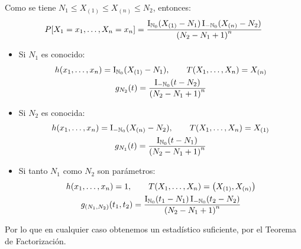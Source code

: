\begin{ejercicio}
\begin{enumerate}[label=\alph*)]
            Como se tiene $N_1\leq X_{(1)}\leq X_{(n)}\leq N_2$, entonces:
            \begin{equation*}
                P[X_1=x_1, \ldots, X_n=x_n] = \dfrac{\operatorname{I}_{\mathbb{N}_0}(X_{(1)}-N_1)\operatorname{I}_{-\mathbb{N}_0}(X_{(n)}-N_2)}{{(N_2-N_1+1)}^{n}}
            \end{equation*}
            \begin{itemize}
                \item Si $N_1$ es conocido:
                    \begin{gather*}
                        h(x_1, \ldots, x_n) = \operatorname{I}_{\mathbb{N}_0}(X_{(1)}-N_1), \qquad T(X_1, \ldots, X_n) = X_{(n)} \\
                        g_{N_2}(t) = \dfrac{\operatorname{I}_{-\mathbb{N}_0}(t-N_2)}{{(N_2-N_1+1)}^{n}}
                    \end{gather*}
                \item Si $N_2$ es conocida:
                    \begin{gather*}
                        h(x_1, \ldots, x_n) = \operatorname{I}_{-\mathbb{N}_0}(X_{(n)}-N_2), \qquad T(X_1, \ldots, X_n) = X_{(1)} \\
                        g_{N_1}(t) = \dfrac{\operatorname{I}_{\mathbb{N}_0}(t-N_1)}{{(N_2-N_1+1)}^{n}}
                    \end{gather*}
                \item Si tanto $N_1$ como $N_2$ son parámetros:
                    \begin{gather*}
                        h(x_1,\ldots,x_n) = 1, \qquad T(X_1, \ldots, X_n) = \left(X_{(1)}, X_{(n)}\right) \\
                        g_{(N_1,N_2)}(t_1,t_2) = \dfrac{\operatorname{I}_{\mathbb{N}_0}(t_1-N_1)\operatorname{I}_{-\mathbb{N}_0}(t_2-N_2)}{{(N_2-N_1+1)}^{n}}
                    \end{gather*}
            \end{itemize}
            Por lo que en cualquier caso obtenemos un estadístico suficiente, por el Teorema de Factorización.
    \end{enumerate}
\end{ejercicio}

